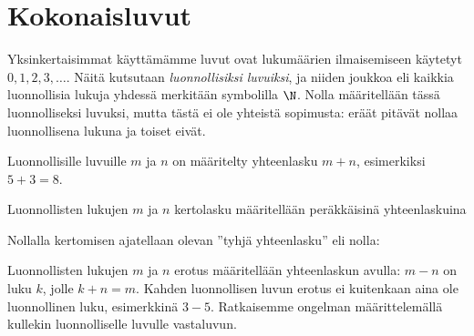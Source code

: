 
% 
% 
% 


% 
% 
% 

\section*{Kokonaisluvut}

Yksinkertaisimmat käyttämämme luvut ovat lukumäärien ilmaisemiseen käytetyt $0, 1, 2, 3, \ldots$. Näitä kutsutaan \emph{luonnollisiksi luvuiksi}, ja niiden joukkoa eli kaikkia luonnollisia lukuja yhdessä merkitään symbolilla $\N$.
Nolla määritellään tässä luonnolliseksi luvuksi, mutta tästä ei ole yhteistä sopimusta: eräät pitävät nollaa luonnollisena lukuna ja toiset eivät.

Luonnollisille luvuille $m$ ja $n$ on määritelty yhteenlasku $m + n$, esimerkiksi $5 + 3 = 8$.

Luonnollisten lukujen $m$ ja $n$ kertolasku määritellään peräkkäisinä yhteenlaskuina
\laatikko{
\[m \cdot n = \underbrace{m + m + \ldots + m}_{n\text{ kpl}} = \underbrace{n + n + \ldots + n}_{m\text{ kpl}}.\]
}

Nollalla kertomisen ajatellaan olevan ''tyhjä yhteenlasku'' eli nolla:

\laatikko{
\[0 \cdot m = 0\]
}

Luonnollisten lukujen $m$ ja $n$ erotus määritellään yhteenlaskun avulla:
$m-n$ on luku $k$, jolle $k + n = m$. Kahden luonnollisen luvun erotus
ei kuitenkaan aina ole luonnollinen luku, esimerkkinä $3 - 5$.
Ratkaisemme ongelman määrittelemällä kullekin luonnolliselle
luvulle vastaluvun.

